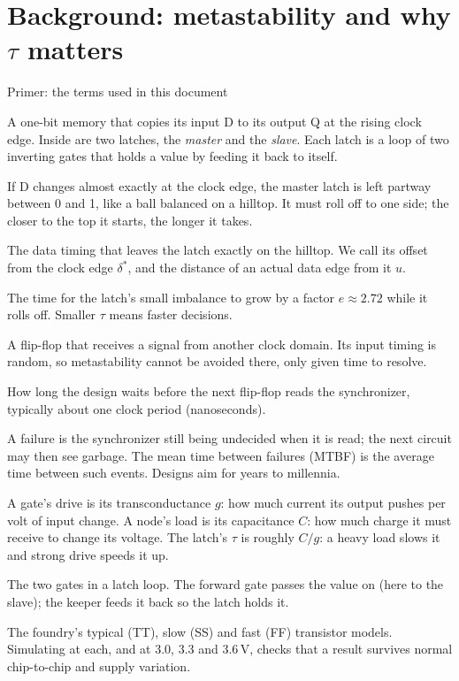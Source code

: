 \documentclass[11pt]{article}
\begin{document}
\section{Background: metastability and why $\tau$ matters}
\label{sec:background}
\begin{keybox}{Primer: the terms used in this document}
\begin{description}[leftmargin=0pt,itemsep=2pt,font=\normalfont\bfseries]
\item[Flip-flop.] A one-bit memory that copies its input D to its output Q at the rising clock edge. Inside are two
  latches, the \emph{master} and the \emph{slave}. Each latch is a loop of two inverting gates that holds a value by
  feeding it back to itself.
\item[Metastability.] If D changes almost exactly at the clock edge, the master latch is left partway between 0 and 1,
  like a ball balanced on a hilltop. It must roll off to one side; the closer to the top it starts, the longer it takes.
\item[Balance point.] The data timing that leaves the latch exactly on the hilltop. We call its offset from the clock
  edge $\delta^*$, and the distance of an actual data edge from it $u$.
\item[$\tau$ (tau).] The time for the latch's small imbalance to grow by a factor $e\approx2.72$ while it rolls off.
  Smaller $\tau$ means faster decisions.
\item[Synchronizer.] A flip-flop that receives a signal from another clock domain. Its input timing is random, so
  metastability cannot be avoided there, only given time to resolve.
\item[Settling time $S$.] How long the design waits before the next flip-flop reads the synchronizer, typically
  about one clock period (nanoseconds).
\item[Failure and MTBF.] A failure is the synchronizer still being undecided when it is read; the next circuit may
  then see garbage. The mean time between failures (MTBF) is the average time between such events. Designs aim for
  years to millennia.
\item[Drive and load.] A gate's drive is its transconductance $g$: how much current its output pushes per volt of
  input change. A node's load is its capacitance $C$: how much charge it must receive to change its voltage. The
  latch's $\tau$ is roughly $C/g$: a heavy load slows it and strong drive speeds it up.
\item[Forward and keeper.] The two gates in a latch loop. The forward gate passes the value on (here to the slave);
  the keeper feeds it back so the latch holds it.
\item[Corners.] The foundry's typical (TT), slow (SS) and fast (FF) transistor models. Simulating at each, and at
  3.0, 3.3 and 3.6\,V, checks that a result survives normal chip-to-chip and supply variation.
\end{description}
\end{keybox}
\end{document}
